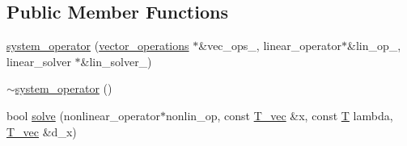 \subsection*{Public Member Functions}
\begin{DoxyCompactItemize}
\item 
\hyperlink{classnonlinear__operators_1_1system__operator_a4793286722aae7ed522ae58239753a74}{system\-\_\-operator} (\hyperlink{container__test_8cpp_aca3cc0310428d338f3a165c7823d6499}{vector\-\_\-operations} $\ast$\&vec\-\_\-ops\-\_\-, linear\-\_\-operator$\ast$\&lin\-\_\-op\-\_\-, linear\-\_\-solver $\ast$\&lin\-\_\-solver\-\_\-)
\item 
\hyperlink{classnonlinear__operators_1_1system__operator_a9d3e1015889d7896138cc7228866e91d}{$\sim$system\-\_\-operator} ()
\item 
bool \hyperlink{classnonlinear__operators_1_1system__operator_a37c7e565a4f696b0df71c8257a92c49a}{solve} (nonlinear\-\_\-operator$\ast$nonlin\-\_\-op, const \hyperlink{classnonlinear__operators_1_1system__operator_a87719a3fbcb842cc1f8305c59e17cbae}{T\-\_\-vec} \&x, const \hyperlink{classnonlinear__operators_1_1system__operator_ace913d6e3749a1c318f2e3654e9f570e}{T} lambda, \hyperlink{classnonlinear__operators_1_1system__operator_a87719a3fbcb842cc1f8305c59e17cbae}{T\-\_\-vec} \&d\-\_\-x)
\end{DoxyCompactItemize}


